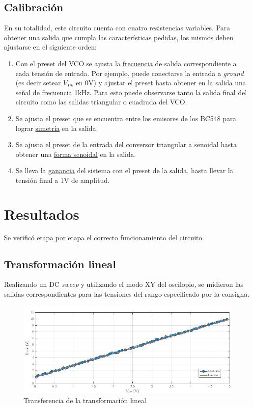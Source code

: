 \documentclass[../../tc_tp6_main.tex]{subfiles}
\begin{document}
\subsection{Calibraci\'on}

En su totalidad, este circuito cuenta con cuatro resistencias variables. Para obtener una salida que cumpla las caracter\'isticas pedidas, los mismos deben ajustarse en el siguiente orden:

\begin{enumerate}
	\item Con el preset del VCO se ajusta la \underline{frecuencia} de salida correspondiente a cada tensi\'on de entrada. Por ejemplo, puede conectarse la entrada a \textit{ground} (es decir setear $V_{IN}$ en 0V) y ajustar el preset hasta obtener en la salida una se\~nal de frecuencia 1kHz. Para esto puede observarse tanto la salida final del circuito como las salidas triangular o cuadrada del VCO.
	\item Se ajusta el preset que se encuentra entre los emisores de los BC548 para lograr \underline{simetr\'ia} en la salida.
	\item Se ajusta el preset de la entrada del conversor triangular a senoidal hasta obtener una \underline{forma senoidal} en la salida.
	\item Se lleva la \underline{ganancia} del sistema con el preset de la salida, hasta llevar la tensi\'on final a 1V de amplitud. 
\end{enumerate}

\newpage

\section{Resultados}

Se verific\'o etapa por etapa el correcto funcionamiento del circuito.

\subsection{Transformaci\'on lineal}

Realizando un DC \textit{sweep} y utilizando el modo XY del oscilopio, se midieron las salidas correspondientes para las tensiones del rango especificado por la consigna.

\begin{figure}[H]
	\centering
	\includegraphics[scale=0.71]{imagenes/tc_tp6_ej3_tl.jpg}
	\caption{Transferencia de la transformaci\'on lineal}
\end{figure}
\end{document}
